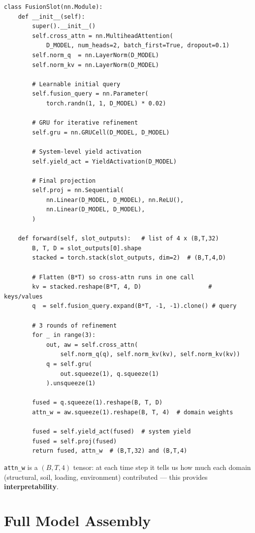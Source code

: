 \documentclass[12pt,a4paper]{article}
\begin{document}
\begin{lstlisting}[caption={FusionSlot — cross-attention over the 4 specialist slots.}]
class FusionSlot(nn.Module):
    def __init__(self):
        super().__init__()
        self.cross_attn = nn.MultiheadAttention(
            D_MODEL, num_heads=2, batch_first=True, dropout=0.1)
        self.norm_q  = nn.LayerNorm(D_MODEL)
        self.norm_kv = nn.LayerNorm(D_MODEL)

        # Learnable initial query
        self.fusion_query = nn.Parameter(
            torch.randn(1, 1, D_MODEL) * 0.02)

        # GRU for iterative refinement
        self.gru = nn.GRUCell(D_MODEL, D_MODEL)

        # System-level yield activation
        self.yield_act = YieldActivation(D_MODEL)

        # Final projection
        self.proj = nn.Sequential(
            nn.Linear(D_MODEL, D_MODEL), nn.ReLU(),
            nn.Linear(D_MODEL, D_MODEL),
        )

    def forward(self, slot_outputs):   # list of 4 x (B,T,32)
        B, T, D = slot_outputs[0].shape
        stacked = torch.stack(slot_outputs, dim=2)  # (B,T,4,D)

        # Flatten (B*T) so cross-attn runs in one call
        kv = stacked.reshape(B*T, 4, D)                   # keys/values
        q  = self.fusion_query.expand(B*T, -1, -1).clone() # query

        # 3 rounds of refinement
        for _ in range(3):
            out, aw = self.cross_attn(
                self.norm_q(q), self.norm_kv(kv), self.norm_kv(kv))
            q = self.gru(
                out.squeeze(1), q.squeeze(1)
            ).unsqueeze(1)

        fused = q.squeeze(1).reshape(B, T, D)
        attn_w = aw.squeeze(1).reshape(B, T, 4)  # domain weights

        fused = self.yield_act(fused)  # system yield
        fused = self.proj(fused)
        return fused, attn_w  # (B,T,32) and (B,T,4)
\end{lstlisting}

\texttt{attn\_w} is a $(B,T,4)$ tensor: at each time step it tells us how much each domain (structural, soil, loading, environment) contributed — this provides \textbf{interpretability}.

\section{Full Model Assembly}
\end{document}
